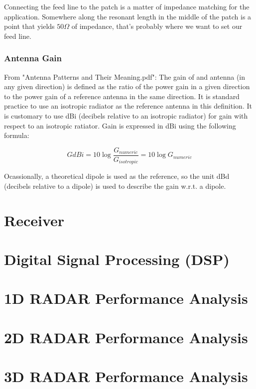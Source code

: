 \documentclass[]{article}
\begin{document}
Connecting the feed line to the patch is a matter of impedance matching for the application. Somewhere along the resonant length in the middle of the patch is a point that yields $ 50 \Omega $ of impedance, that's probably where we want to set our feed line.

\subsubsection{Antenna Gain}
From "Antenna Patterns and Their Meaning.pdf":
The gain of and antenna (in any given direction) is defined as the ratio of the power gain in a given direction to the power gain of a reference antenna in the same direction. It is standard practice to use an isotropic radiator as the reference antenna in this definition. It is customary to use dBi (decibels relative to an isotropic radiator) for gain with respect to an isotropic ratiator. Gain is expressed in dBi using the following formula:

\begin{equation}
GdBi = 10 \log{ \frac{G_{numeric}}{G_{isotropic}} } = 10 \log{ G_{numeric} }
\end{equation}

Ocassionally, a theoretical dipole is used as the reference, so the unit dBd (decibels relative to a dipole) is used to describe the gain w.r.t. a dipole.

\section{Receiver}

\section{Digital Signal Processing (DSP)}

\section{1D RADAR Performance Analysis}

\section{2D RADAR Performance Analysis}

\section{3D RADAR Performance Analysis}
\end{document}
